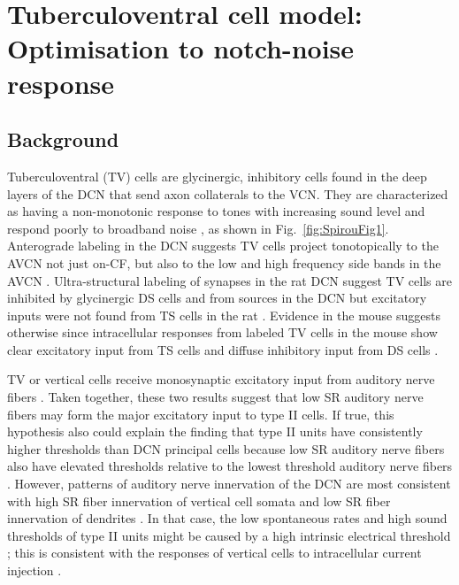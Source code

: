 
\graphicspath{{./gfx/}{../figures/}{/media/data/Work/cnstellate/}{/media/data/Work/cnstellate/TV_notch/}{/media/data/Work/Responses/}{/media/data/Work/thesis/ans2010/gfx/}}
\newpage
\section[TV Cell Model]{Tuberculoventral cell model: Optimisation to notch-noise response}
\label{sec:TV-cell-model}

\subsection{Background}

Tuberculoventral (TV) cells are glycinergic, inhibitory cells found in
the deep layers of the DCN that send axon collaterals to the
VCN\@. They are characterized as having a non-monotonic response to
tones with increasing sound level and respond poorly to broadband
noise \citep{SpirouDavisEtAl:1999,NelkenYoung:1997,ReissYoung:2005},
as shown in Fig.~\ref{fig:SpirouFig1}.  Anterograde labeling in the
DCN suggests TV cells project tonotopically to the AVCN not just
on-CF, but also to the low and high frequency side bands in the AVCN
\citep{MunirathinamOstapoffEtAl:2004,OstapoffMorestEtAl:1999}.
Ultra-structural labeling of synapses in the rat DCN suggest TV cells
are inhibited by glycinergic DS cells and from sources in the DCN but
excitatory inputs were not found from TS cells in the rat
\citep{Rubio:2005}. Evidence in the mouse suggests otherwise since
intracellular responses from labeled TV cells in the mouse show clear
excitatory input from TS cells and diffuse inhibitory input from DS
cells \citep{ZhangOertel:1993b,WickesbergOertel:1993}.

\medskip{} 

TV or vertical cells receive monosynaptic excitatory input from
auditory nerve ﬁbers
\citep{OertelWu:1989}\citep{ZhangOertel:1993b}. Taken together, these
two results suggest that low SR auditory nerve ﬁbers may form the
major excitatory input to type II cells. If true, this hypothesis also
could explain the ﬁnding that type II units have consistently higher
thresholds than DCN principal cells \citep{YoungBrownell:1976} because
low SR auditory nerve ﬁbers also have elevated thresholds relative to
the lowest threshold auditory nerve ﬁbers
\citep{Liberman:1978}. However, patterns of auditory nerve innervation
of the DCN are most consistent with high SR ﬁber innervation of
vertical cell somata and low SR ﬁber innervation of dendrites
\citep{Liberman:1993}. In that case, the low spontaneous rates and
high sound thresholds of type II units might be caused by a high
intrinsic electrical threshold \citep{HancockDavisEtAl:1997}; this is
consistent with the responses of vertical cells to intracellular
current injection \citep{DingVoigt:1997,ZhangOertel:1993b}.


